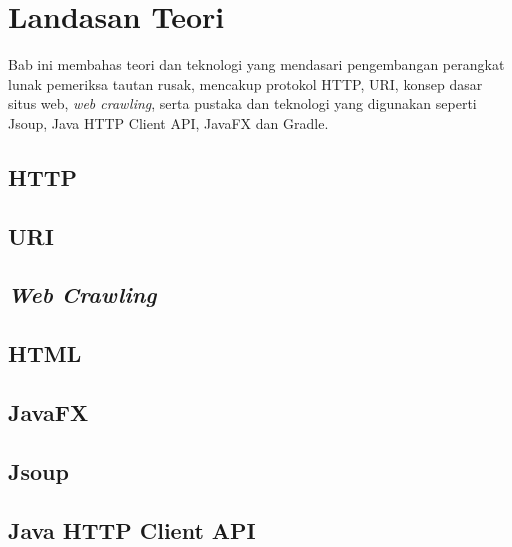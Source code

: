 \chapter{Landasan Teori}
\label{chap:landasan-teori}
Bab ini membahas teori dan teknologi yang mendasari pengembangan perangkat lunak pemeriksa tautan rusak, mencakup protokol HTTP, URI, konsep dasar situs web, \textit{web crawling}, serta pustaka dan teknologi yang digunakan seperti Jsoup, Java HTTP Client API, JavaFX dan Gradle.


\section{HTTP~\cite{RFC9110}}
\label{sec:02-http}



\section{URI~\cite{RFC3986}}
\label{sec:02-uri}



\section{\textit{Web Crawling}~\cite{liu:11:webdatamining}}
\label{sec:02-web-crawling}



\section{HTML~\cite{powell:10:htmlcss}}
\label{sec:02-html}



\section{JavaFX~\cite{sharan:22:learnjavafx17}}
\label{sec:02-javafx}



\section{Jsoup}
\label{sec:02-jsoup}



\section{Java HTTP Client API}
\label{sec:02-java-http-client-api}



